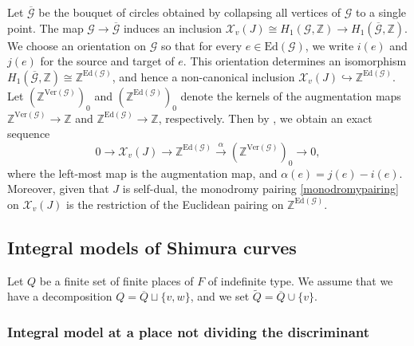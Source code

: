 \documentclass[a4paper, notitlepage, 10pt]{amsart}
\theoremstyle{plain} %
\theoremstyle{definition} %
\theoremstyle{remark} %
\numberwithin{equation}{section}
\newcommand{\bbZ}{\mathbb Z}
\begin{document}
Let $\overline{\mathcal{G}}$ be the bouquet of circles obtained by collapsing all vertices of $\mathcal{G}$ to a single point. The map $\mathcal{G}\to \overline{\mathcal{G}}$ induces an inclusion $\mathcal{X}_v(J)\cong H_1(\mathcal{G},\mathbb{Z})\to H_1(\overline{\mathcal{G}},\mathbb{Z})$. We choose an orientation on $\mathcal{G}$ so that for every $e\in \text{Ed}(\mathcal{G})$, we write $i(e)$ and $j(e)$ for the source and target of $e$. This orientation determines an isomorphism $H_1(\overline{\mathcal{G}},\mathbb{Z})\cong \mathbb{Z}^{\mathrm{Ed}(\mathcal{G})}$, and hence a non-canonical inclusion $\mathcal{X}_v(J)\hookrightarrow \mathbb{Z}^{\mathrm{Ed}(\mathcal{G})}$. Let $(\bbZ^{\text{Ver}(\mathcal{G})})_0$ and $(\mathbb{Z}^{\text{Ed}(\mathcal{G})})_0$ denote the kernels of the augmentation maps $\bbZ^{\text{Ver}(\mathcal{G})}\rightarrow \bbZ$ and $\bbZ^{\text{Ed}(\mathcal{G})}\rightarrow \bbZ$, respectively. Then by \cite[Proposition 2.2]{Ribet90}, we obtain an exact sequence
\begin{equation}\label{dualgraphexactsequence}
    0\rightarrow \mathcal{X}_v(J) \rightarrow \bbZ^{\text{Ed}(\mathcal{G})}\xrightarrow{\alpha} (\bbZ^{\text{Ver}(\mathcal{G})})_0 \rightarrow 0,
\end{equation}
where the left-most map is the augmentation map, and $\alpha(e)=j(e)-i(e)$. Moreover, given that $J$ is self-dual, the monodromy pairing \eqref{monodromypairing} on $\mathcal{X}_v(J)$ is the restriction of the Euclidean pairing on $\bbZ^{\text{Ed}(\mathcal{G})}$.
\subsection{Integral models of Shimura curves}\label{integralmodelsofshimuracurves}
Let $Q$ be a finite set of finite places of $F$ of indefinite type. We assume that we have a decomposition $Q=\overline{Q}\sqcup \{v,w\}$, and we set $\widetilde{Q}=\overline{Q}\cup\{v\}$.
\subsubsection{ Integral model at a place not dividing the discriminant}\label{integralmodel1} 
\end{document}
